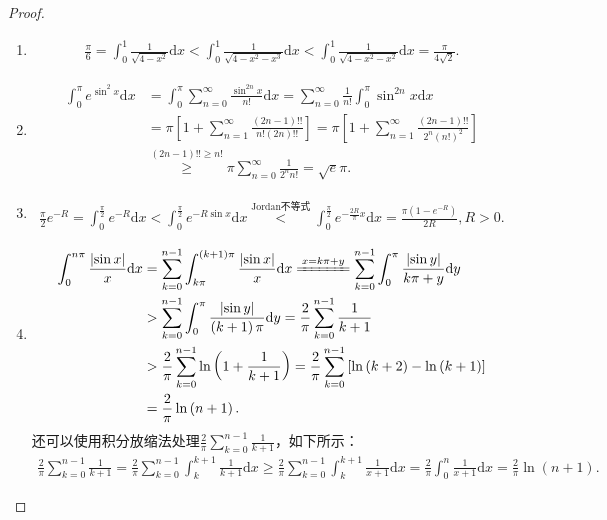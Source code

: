 \documentclass[../../main.tex]{subfiles}
\begin{document}
\begin{proof}
\begin{enumerate}
\item \begin{align*}
\frac{\pi}{6}=\int_{0}^{1}\frac{1}{\sqrt{4 - x^{2}}}\mathrm{d}x < \int_{0}^{1}\frac{1}{\sqrt{4 - x^{2}-x^{3}}}\mathrm{d}x < \int_{0}^{1}\frac{1}{\sqrt{4 - x^{2}-x^{2}}}\mathrm{d}x=\frac{\pi}{4\sqrt{2}}.
\end{align*}

\item \begin{align*}
\int_0^{\pi}{e^{\sin ^2x}\mathrm{d}x}&=\int_0^{\pi}{\sum_{n=0}^{\infty}{\frac{\sin ^{2n}x}{n!}}\mathrm{d}x}=\sum_{n=0}^{\infty}{\frac{1}{n!}\int_0^{\pi}{\sin ^{2n}x\mathrm{d}x}}
\\
&=\pi \left[ 1+\sum_{n=1}^{\infty}{\frac{(2n-1)!!}{n!(2n)!!}} \right] =\pi \left[ 1+\sum_{n=1}^{\infty}{\frac{(2n-1)!!}{2^n\left( n! \right) ^2}} \right] 
\\
&\overset{(2n-1)!!\geqslant n!}{\geqslant}\pi \sum_{n=0}^{\infty}{\frac{1}{2^nn!}}=\sqrt{e}\pi .
\end{align*}

\item \begin{align*}
\frac{\pi}{2}e^{-R}=\int_{0}^{\frac{\pi}{2}}e^{-R}\mathrm{d}x < \int_{0}^{\frac{\pi}{2}}e^{-R\sin x}\mathrm{d}x\stackrel{\hyperref[theorem:Jordan不等式]{\text{Jordan不等式}}}{<}\int_{0}^{\frac{\pi}{2}}e^{-\frac{2R}{\pi}x}\mathrm{d}x=\frac{\pi(1 - e^{-R})}{2R}, R > 0.
\end{align*} 

\item \begin{align*}
\int_0^{n\pi}{\frac{\left| \sin x \right|}{x}\mathrm{d}x}&=\sum_{k=0}^{n-1}{\int_{k\pi}^{\left( k+1 \right) \pi}{\frac{\left| \sin x \right|}{x}\mathrm{d}x}}\xlongequal{x=k\pi +y}\sum_{k=0}^{n-1}{\int_0^{\pi}{\frac{\left| \sin y \right|}{k\pi +y}\mathrm{d}y}}
\\
&>\sum_{k=0}^{n-1}{\int_0^{\pi}{\frac{\left| \sin y \right|}{\left( k+1 \right) \pi}\mathrm{d}y}}=\frac{2}{\pi}\sum_{k=0}^{n-1}{\frac{1}{k+1}}
\\
&>\frac{2}{\pi}\sum_{k=0}^{n-1}{\ln \left( 1+\frac{1}{k+1} \right)}=\frac{2}{\pi}\sum_{k=0}^{n-1}{\left[ \ln \left( k+2 \right) -\ln \left( k+1 \right) \right]}
\\
&=\frac{2}{\pi}\ln \left( n+1 \right) .
\end{align*}
还可以使用积分放缩法处理$\frac{2}{\pi}\sum_{k=0}^{n-1}{\frac{1}{k+1}}$，如下所示：
\begin{align*}
\frac{2}{\pi}\sum_{k=0}^{n-1}{\frac{1}{k+1}}=\frac{2}{\pi}\sum_{k=0}^{n-1}{\int_k^{k+1}{\frac{1}{k+1}\mathrm{d}x}}\geqslant \frac{2}{\pi}\sum_{k=0}^{n-1}{\int_k^{k+1}{\frac{1}{x+1}\mathrm{d}x}}=\frac{2}{\pi}\int_0^n{\frac{1}{x+1}\mathrm{d}x}=\frac{2}{\pi}\ln \left( n+1 \right) .
\end{align*}
\end{enumerate}

\end{proof}
\end{document}
